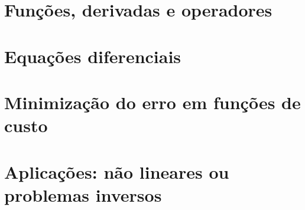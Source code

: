 \documentclass[12pt]{extbook} %
\begin{document}
\part{Funções, derivadas e operadores}





\part{Equações diferenciais}


\part{Minimização do erro em funções de custo}




\part{Aplicações: não lineares ou problemas inversos}



\end{document}
